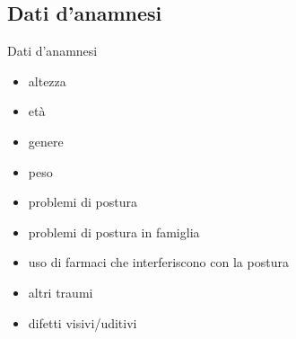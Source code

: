 \documentclass{beamer}
\begin{document}
    \subsection{Dati d'anamnesi}
    \begin{frame}{Dati d'anamnesi}
        \begin{itemize}
            \item altezza
            \pause
            \item età
            \pause
            \item genere
            \pause
            \item peso
            \pause
            \item problemi di postura
            \pause
            \item problemi di postura in famiglia
            \pause
            \item uso di farmaci che interferiscono con la postura
            \pause
            \item altri traumi
            \pause
            \item difetti visivi/uditivi
        \end{itemize}
    \end{frame}
\end{document}
